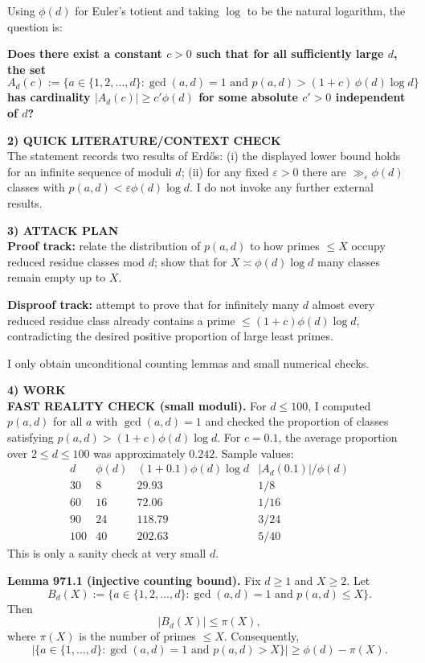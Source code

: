 Using $\phi(d)$ for Euler's totient and taking $\log$ to be the natural logarithm, the question is:

\textbf{Does there exist a constant $c>0$ such that for all sufficiently large $d$, the set}
\[
 A_d(c):=\{a\in\{1,2,\dots,d\}: \gcd(a,d)=1\text{ and }p(a,d)>(1+c)\,\phi(d)\log d\}
\]
\textbf{has cardinality $|A_d(c)|\ge c'\phi(d)$ for some absolute $c'>0$ independent of $d$?}

\medskip
\noindent\textbf{2) QUICK LITERATURE/CONTEXT CHECK}\\
The statement records two results of Erd\H{o}s: (i) the displayed lower bound holds for an infinite sequence of moduli $d$; (ii) for any fixed $\varepsilon>0$ there are $\gg_\varepsilon \phi(d)$ classes with $p(a,d)<\varepsilon\phi(d)\log d$.  I do not invoke any further external results.

\medskip
\noindent\textbf{3) ATTACK PLAN}\\
\textbf{Proof track:} relate the distribution of $p(a,d)$ to how primes $\le X$ occupy reduced residue classes mod $d$; show that for $X\asymp \phi(d)\log d$ many classes remain empty up to $X$.

\textbf{Disproof track:} attempt to prove that for infinitely many $d$ almost every reduced residue class already contains a prime $\le (1+c)\phi(d)\log d$, contradicting the desired positive proportion of large least primes.

I only obtain unconditional counting lemmas and small numerical checks.

\medskip
\noindent\textbf{4) WORK}\\
\textbf{FAST REALITY CHECK (small moduli).} For $d\le 100$, I computed $p(a,d)$ for all $a$ with $\gcd(a,d)=1$ and checked the proportion of classes satisfying $p(a,d)>(1+c)\phi(d)\log d$.
For $c=0.1$, the average proportion over $2\le d\le 100$ was approximately $0.242$.  Sample values:
\[
\begin{array}{c|c|c|c}
 d & \phi(d) & (1+0.1)\phi(d)\log d & |A_d(0.1)|/\phi(d)\\\hline
 30 & 8 & 29.93 & 1/8\\
 60 & 16 & 72.06 & 1/16\\
 90 & 24 & 118.79 & 3/24\\
 100 & 40 & 202.63 & 5/40
\end{array}
\]
This is only a sanity check at very small $d$.

\medskip
\noindent\textbf{Lemma 971.1 (injective counting bound).}\label{lem:971-injection}
Fix $d\ge 1$ and $X\ge 2$.
Let
\[
B_d(X):=\{a\in\{1,2,\dots,d\}: \gcd(a,d)=1\text{ and } p(a,d)\le X\}.
\]
Then
\[
|B_d(X)|\le \pi(X),
\]
where $\pi(X)$ is the number of primes $\le X$.  Consequently,
\[
|\{a\in\{1,\dots,d\}: \gcd(a,d)=1\text{ and }p(a,d)>X\}|\ge \phi(d)-\pi(X).
\]

